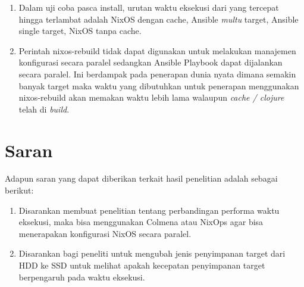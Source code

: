 \documentclass[10pt,]{report}
\begin{document}
\begin{adjustwidth}{20pt}{}
\begin{enumerate}[label=\arabic*.]
    \begin{enumerate}[label=\alph*.]
      \item Dalam uji coba pasca install, urutan waktu eksekusi dari yang tercepat
        hingga terlambat adalah NixOS dengan cache, Ansible \textit{multu} target, 
        Ansible single target, NixOS tanpa cache.
      \item Perintah nixos-rebuild tidak dapat digunakan untuk melakukan manajemen 
        konfigurasi secara paralel sedangkan Ansible Playbook dapat dijalankan secara 
        paralel. Ini berdampak pada penerapan dunia nyata dimana semakin banyak 
        target maka waktu yang dibutuhkan untuk penerapan menggunakan nixos-rebuild 
        akan memakan waktu lebih lama walaupun \textit{cache / clojure} telah di 
        \textit{build}.
    \end{enumerate}
  \end{enumerate}
\end{adjustwidth}
\section{Saran}
\begin{adjustwidth}{20pt}{}
  \hspace\parindent
  Adapun saran yang dapat diberikan terkait hasil penelitian adalah sebagai berikut:
  \begin{enumerate}
    \item Disarankan membuat penelitian tentang perbandingan performa waktu eksekusi,
      maka bisa menggunakan Colmena atau NixOps agar bisa menerapakan konfigurasi NixOS 
      secara paralel.
    \item Disarankan bagi peneliti untuk mengubah jenis penyimpanan target dari HDD 
      ke SSD untuk melihat apakah kecepatan penyimpanan target berpengaruh pada waktu 
      eksekusi.
  \end{enumerate}
\end{adjustwidth}
\printbibliography[title={DAFTAR PUSTAKA}]
\end{document}
